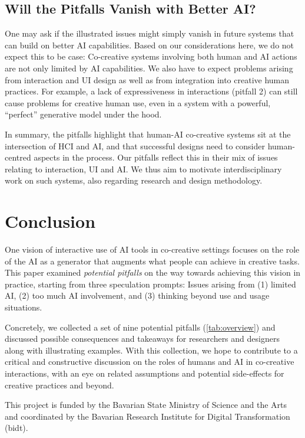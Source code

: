 \documentclass[
twocolumn,
]{ceurart}
\begin{document}
\subsection{Will the Pitfalls Vanish with Better AI?}
One may ask if the illustrated issues might simply vanish in future systems that can build on better AI capabilities. Based on our considerations here, we do not expect this to be case: Co-creative systems involving both human and AI actions are not only limited by AI capabilities. We also have to expect problems arising from interaction and UI design as well as from integration into creative human practices. For example, a lack of expressiveness in interactions (pitfall 2) can still cause problems for creative human use, even in a system with a powerful, ``perfect'' generative model under the hood. 

In summary, the pitfalls highlight that human-AI co-creative systems sit at the intersection of HCI and AI, and that successful designs need to consider human-centred aspects in the process.
Our pitfalls reflect this in their mix of issues relating to interaction, UI and AI. We thus aim to motivate interdisciplinary work on such systems, also regarding research and design methodology.




\section{Conclusion}

One vision of interactive use of AI tools in co-creative settings focuses on the role of the AI as a generator that augments what people can achieve in creative tasks. This paper examined \textit{potential pitfalls} on the way towards achieving this vision in practice, starting from three speculation prompts: Issues arising from  (1) limited AI, (2) too much AI involvement, and (3) thinking beyond use and usage situations.

Concretely, we collected a set of nine potential pitfalls (\cref{tab:overview}) and discussed possible consequences and takeaways for researchers and designers along with illustrating examples. 
With this collection, we hope to contribute to a critical and constructive discussion on the roles of humans and AI in co-creative interactions, with an eye on related assumptions and potential side-effects for creative practices and beyond.



\begin{acknowledgments}
This project is funded by the Bavarian State Ministry of Science and the Arts and coordinated by the Bavarian Research Institute for Digital Transformation (bidt).
\end{acknowledgments}

\balance

\end{document}
